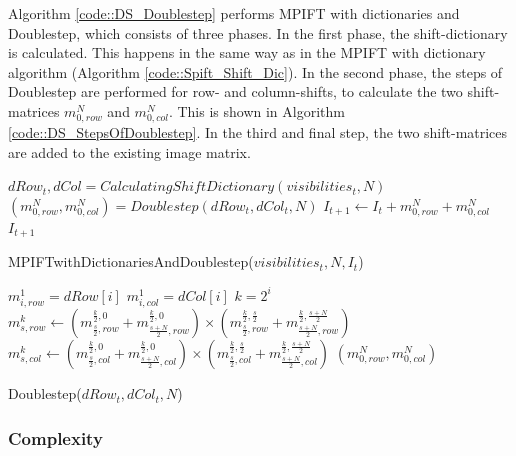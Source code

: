 \documentclass[12pt]{article}
\begin{document}
Algorithm \ref{code::DS_Doublestep} performs MPIFT with dictionaries and Doublestep, which consists of three phases. In the first phase, the shift-dictionary is calculated. This happens in the same way as in the MPIFT with dictionary algorithm (Algorithm \ref{code::Spift_Shift_Dic}). In the second phase, the steps of Doublestep are performed for row- and column-shifts, to calculate the two shift-matrices $m_{0, row}^N$ and $m_{0,col}^N$. This is shown in Algorithm \ref{code::DS_StepsOfDoublestep}. In the third and final step, the two shift-matrices are added to the existing image matrix.



\begin{algorithm}
	\begin{algorithmic}[1]
		\State $dRow_t, dCol = CalculatingShiftDictionary(visibilities_t,N)$
		\State $(m_{0,row}^N,m_{0,col}^N) = Doublestep({dRow}_t,{dCol}_t, N)$
		\State $I_{t+1} \leftarrow I_t + m_{0,row}^N + m_{0,col}^N$
		\State \Return $I_{t+1}$
	\end{algorithmic}
\caption{MPIFTwithDictionariesAndDoublestep(${visibilities}_t, N, I_t$)}\label{euclid}
\label{code::DS_Doublestep}
\end{algorithm}


\begin{algorithm}
	\begin{algorithmic}[1]
			\State $m_{i,row}^{1} = dRow[i]$
			\State $m_{i,col}^{1} = dCol[i]$
		\EndFor
			\State $k = 2^i$
				\State $m_{s,row}^k \leftarrow (m_{\frac{s}{2},row}^{\frac{k}{2},0}+
				m_{\frac{s+N}{2},row}^{\frac{k}{2},0})
				\times
				(m_{\frac{s}{2},row}^{\frac{k}{2},\frac{s}{2}}+
				m_{\frac{s+N}{2},row}^{\frac{k}{2},\frac{s+N}{2}})
				$
				\State $m_{s,col}^k \leftarrow (m_{\frac{s}{2},col}^{\frac{k}{2},0}+
				m_{\frac{s+N}{2},col}^{\frac{k}{2},0})
				\times
				(m_{\frac{s}{2},col}^{\frac{k}{2},\frac{s}{2}}+
				m_{\frac{s+N}{2},col}^{\frac{k}{2},\frac{s+N}{2}})
				$
			\EndFor
		\EndFor
		\Return $(m_{0,row}^N,m_{0,col}^N)$
	\end{algorithmic}
\caption{Doublestep(${dRow}_t,{dCol}_t, N$)}\label{euclid}
\label{code::DS_StepsOfDoublestep}
\end{algorithm}

\subsubsection{Complexity}
\label{sec::DB_complexity}
\end{document}
